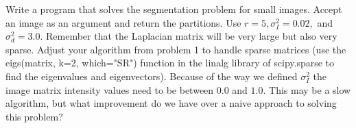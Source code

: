 \begin{problem}  Write a program that solves the segmentation problem for small images.
Accept an image as an argument and return the partitions.
Use $r = 5, \sigma_I^2 = 0.02,$ and $\sigma_d^2 = 3.0$.
Remember that the Laplacian matrix will be very large but also very sparse.
Adjust your algorithm from problem 1 to handle sparse matrices (use the eigs(matrix, k=2, which="SR") function in the linalg library of scipy.sparse to find the eigenvalues and eigenvectors).
Because of the way we defined $\sigma_I^2$ the image matrix intensity values need to be between $0.0$ and $1.0$.
This may be a slow algorithm, but what improvement do we have over a naive approach to solving this problem?
\end{problem}
